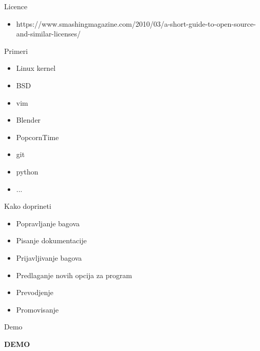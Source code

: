 \documentclass{beamer}
\begin{document}
	\begin{frame}{Licence}
		\begin{itemize}
		\item https://www.smashingmagazine.com/2010/03/a-short-guide-to-open-source-and-similar-licenses/
		\end{itemize}
	\end{frame}
	
	\begin{frame}{Primeri}
		\begin{itemize}
		\item Linux kernel
		\item BSD
		\item vim
		\item Blender
		\item PopcornTime
		\item git
		\item python
		\item ...
		\end{itemize}
	\end{frame}
	
	\begin{frame}{Kako doprineti}
		\begin{itemize}
		\item Popravljanje bagova
		\item Pisanje dokumentacije
		\item Prijavljivanje bagova
		\item Predlaganje novih opcija za program
		\item Prevodjenje
		\item Promovisanje
		\end{itemize}
	\end{frame}
	
	\begin{frame}{Demo}
		\begin{center}
			\textbf{DEMO}
		\end{center}
	\end{frame}	
\end{document}
